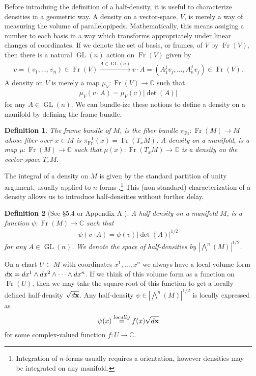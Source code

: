 \documentclass[12pt]{amsart}
\newtheorem{defn}{Definition}
\DeclareMathOperator{\GL}{GL}
\DeclareMathOperator{\Fr}{Fr}
\begin{document}
Before introduing the definition of a half-density, it is useful
to characterize densities in a geometric way.
A density on a vector-space, $V$, is merely a way of measuring the volume
of parallelopipeds.
Mathematically, this means assiging a number to each basis in a way which transforms appropriately under linear changes of coordinates.
If we denote the set of basis, or frames, of $V$ by $\Fr(V)$,
 then there is a natural $\GL(n)$ action on $\Fr(V)$ given by
 \begin{align*}
  v = (v_1,\dots,v_n) \in \Fr(V) \stackrel{A \in \GL(n)}{\mapsto} v \cdot A = (A_1^j v_j, \dots, A_n^j v_j) \in \Fr(V).
 \end{align*}
A density on $V$ is merely a map $\mu_V: \Fr(V) \to \mathbb{C}$ such that
\begin{align*}
  \mu_V( v \cdot A) = \mu_V(v) | \det(A) |
\end{align*}
for any $A \in \GL(n)$.
We can bundle-ize these notions to define a density on a manifold by defining the frame bundle.
\begin{defn}
  The \emph{frame bundle} of $M$, is the fiber bundle $\pi_{\Fr}:\Fr(M) \to M$ whose fiber over $x \in M$ is $\pi_{\Fr}^{-1}(x) = \Fr( T_x M)$.
A \emph{density} on a manifold, is a map $\mu:\Fr(M) \to \mathbb{C}$ such that $\mu(x): \Fr(T_xM) \to \mathbb{C}$ is a density on the vector-space $T_xM$.
\end{defn}
 The integral of a density on $M$ is given by the standard partition of unity argument, usually applied to $n$-forms \cite[Chapter 14]{Lee2006}.\footnote{Integration of $n$-forms usually requires a orientation, however densities may be integrated on any manifold.}
This (non-standard) characterization of a density allows us to introduce half-densities without further delay.

\begin{defn}
  [See \S 5.4 \cite{GuilleminSternberg1970} or Appendix A \cite{BatesWeinstein1997}]
  A half-density on a manifold $M$, is a function $\psi : \Fr(M) \to \mathbb{C}$ such that
  \begin{align*}
    \psi( v \cdot A) = \psi( v ) | \det(A) |^{1/2}
  \end{align*}
  for any $A \in \GL(n)$.
  We denote the space of half-densities by $|\bigwedge^n(M)|^{1/2}$.
\end{defn}

On a chart $U \subset M$ with coordinates $x^1,\dots,x^n$ we always have a local volume form $d{\bf x} = dx^1\wedge dx^2 \wedge \cdots \wedge dx^n$.
If we think of this volume form as a function on $\Fr(U)$, then we may take the square-root of this function to get a locally defined half-density $\sqrt{d{\bf x}}$.
Any half-density $\psi \in | \bigwedge^n(M)|^{1/2}$ is locally expressed as
\begin{align*}
  \psi(x) \stackrel{locally}{=} f(x) \sqrt{d {\bf x}}
\end{align*}
for some complex-valued function $f:U \to \mathbb{C}$.
\end{document}
